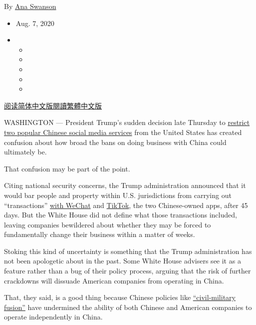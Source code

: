 By \href{https://www.nytimes3xbfgragh.onion/by/ana-swanson}{Ana Swanson}

\begin{itemize}
\item
  Aug. 7, 2020
\item
  \begin{itemize}
  \item
  \item
  \item
  \item
  \item
  \end{itemize}
\end{itemize}

\href{https://cn.nytimes3xbfgragh.onion/business/20200810/trump-executive-order-tiktok-wechat/}{阅读简体中文版}\href{https://cn.nytimes3xbfgragh.onion/business/20200810/trump-executive-order-tiktok-wechat/zh-hant/}{閱讀繁體中文版}

WASHINGTON --- President Trump's sudden decision late Thursday to
\href{https://www.nytimes3xbfgragh.onion/2020/08/06/technology/trump-wechat-tiktok-china.html}{restrict
two popular Chinese social media services} from the United States has
created confusion about how broad the bans on doing business with China
could ultimately be.

That confusion may be part of the point.

Citing national security concerns, the Trump administration announced
that it would bar people and property within U.S. jurisdictions from
carrying out ``transactions''
\href{https://www.nytimes3xbfgragh.onion/2020/08/07/business/trump-china-wechat-tiktok.html}{with
WeChat} and
\href{https://www.nytimes3xbfgragh.onion/2020/08/01/technology/tiktok-trump-microsoft-bytedance-china-ban.html}{TikTok},
the two Chinese-owned apps, after 45 days. But the White House did not
define what those transactions included, leaving companies bewildered
about whether they may be forced to fundamentally change their business
within a matter of weeks.

Stoking this kind of uncertainty is something that the Trump
administration has not been apologetic about in the past. Some White
House advisers see it as a feature rather than a bug of their policy
process, arguing that the risk of further crackdowns will dissuade
American companies from operating in China.

That, they said, is a good thing because Chinese policies like
\href{https://www.state.gov/chinas-military-civil-fusion-strategy-poses-a-risk-to-national-security/}{``civil-military
fusion''} have undermined the ability of both Chinese and American
companies to operate independently in China.

